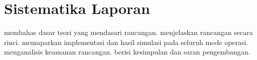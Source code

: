 \section{Sistematika Laporan}
 membahas dasar teori yang mendasari rancangan.  menjelaskan rancangan \algname{} secara rinci.  memaparkan implementasi dan hasil simulasi pada seluruh mode operasi.  menganalisis keamanan rancangan.  berisi kesimpulan dan saran pengembangan.
